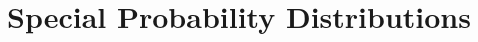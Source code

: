 \documentclass[../main.tex]{subfiles}
\begin{document}
\chapter{Special Probability Distributions}
\end{document}

